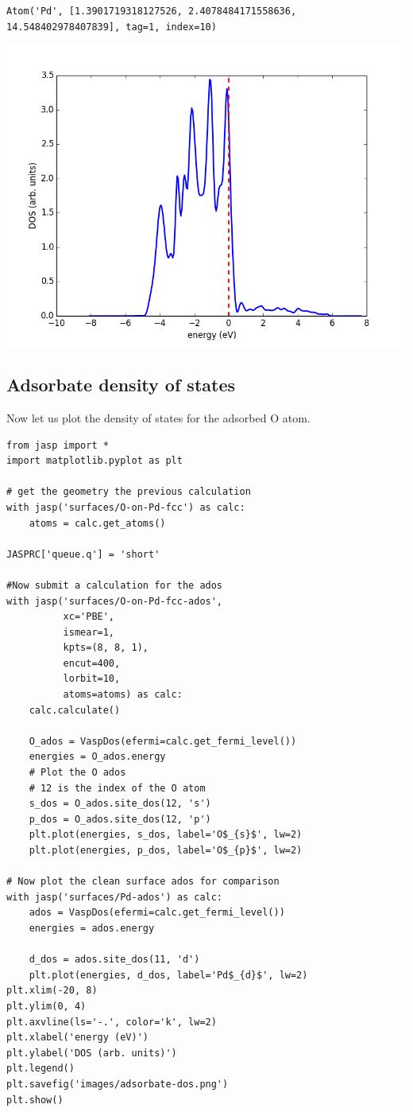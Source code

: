 \documentclass[11pt]{article}
\begin{document}
\begin{verbatim}
Atom('Pd', [1.3901719318127526, 2.4078484171558636, 14.548402978407839], tag=1, index=10)
\end{verbatim}

\includegraphics[width=.9\linewidth]{./images/Pd-ados.png}




\subsection{Adsorbate density of states}
\label{sec-4-3}

Now let us plot the density of states for the adsorbed O atom.

\begin{verbatim}
from jasp import *
import matplotlib.pyplot as plt

# get the geometry the previous calculation
with jasp('surfaces/O-on-Pd-fcc') as calc:
    atoms = calc.get_atoms()

JASPRC['queue.q'] = 'short'

#Now submit a calculation for the ados
with jasp('surfaces/O-on-Pd-fcc-ados',
          xc='PBE',
          ismear=1,
          kpts=(8, 8, 1),
          encut=400,
          lorbit=10,
          atoms=atoms) as calc:
    calc.calculate()

    O_ados = VaspDos(efermi=calc.get_fermi_level())
    energies = O_ados.energy
    # Plot the O ados
    # 12 is the index of the O atom
    s_dos = O_ados.site_dos(12, 's') 
    p_dos = O_ados.site_dos(12, 'p')
    plt.plot(energies, s_dos, label='O$_{s}$', lw=2)
    plt.plot(energies, p_dos, label='O$_{p}$', lw=2)    

# Now plot the clean surface ados for comparison
with jasp('surfaces/Pd-ados') as calc:
    ados = VaspDos(efermi=calc.get_fermi_level())
    energies = ados.energy
    
    d_dos = ados.site_dos(11, 'd')
    plt.plot(energies, d_dos, label='Pd$_{d}$', lw=2)
plt.xlim(-20, 8)
plt.ylim(0, 4)
plt.axvline(ls='-.', color='k', lw=2)
plt.xlabel('energy (eV)')
plt.ylabel('DOS (arb. units)')
plt.legend()
plt.savefig('images/adsorbate-dos.png')
plt.show()
\end{verbatim}
\end{document}
